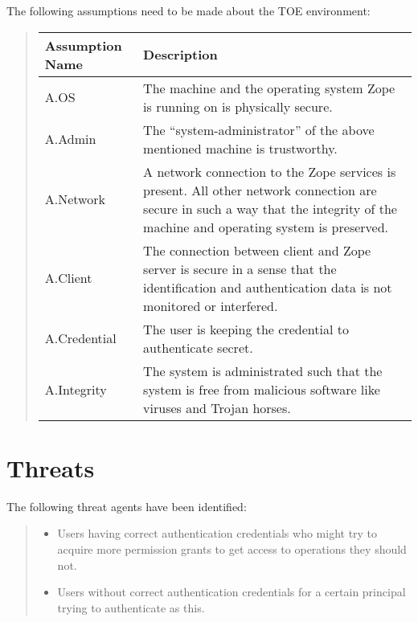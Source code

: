 \documentclass[12pt,english]{scrbook}
\begin{document}
The following assumptions need to be made about the TOE environment:
\begin{quote}

\begin{longtable}[c]{|l|l|}
\hline
\textbf{
Assumption Name
} & \textbf{
Description
} \\
\hline
\endhead

A.OS
 & 
The machine and the operating system Zope is
running on is physically secure.
 \\
\hline

A.Admin
 & 
The ``system-administrator'' of the above
mentioned machine is trustworthy.
 \\
\hline

A.Network
 & 
A network connection to the Zope services is
present. All other network connection are
secure in such a way that the integrity of
the machine and operating system is preserved.
 \\
\hline

A.Client
 & 
The connection between client and Zope server is
secure in a sense that the identification and
authentication data is not monitored or interfered.
 \\
\hline

A.Credential
 & 
The user is keeping the credential to authenticate
secret.
 \\
\hline

A.Integrity
 & 
The system is administrated such that the system is
free from malicious software like viruses and
Trojan horses.
 \\
\hline
\end{longtable}
\end{quote}





\section{Threats}

The following threat agents have been identified:
\begin{quote}
\begin{itemize}
\item {} 
Users having correct authentication credentials who might try to
acquire more permission grants to get access to operations they
should not.

\item {} 
Users without correct authentication credentials for a certain
principal trying to authenticate as this.

\end{itemize}
\end{quote}
\end{document}
